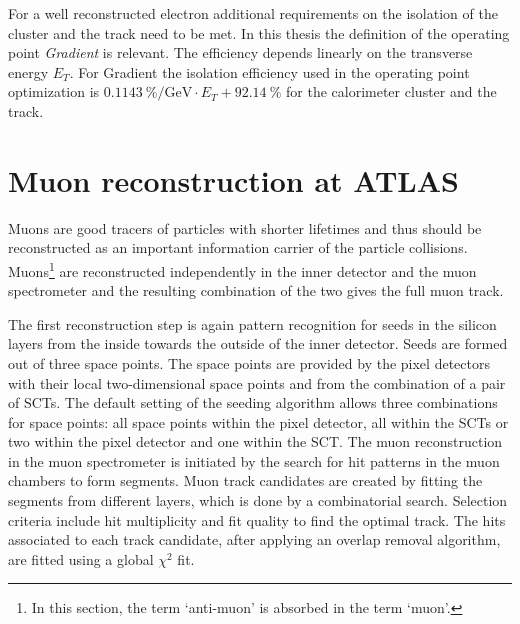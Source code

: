 For a well reconstructed electron additional requirements on the isolation of the cluster and the track need to be met. In this thesis the definition of the operating point \textit{Gradient} is relevant. The efficiency depends linearly on the transverse energy $E_T$. For Gradient the isolation efficiency used in the operating point optimization is $\SI{0.1143}{\percent\per\giga\electronvolt}\cdot E_T+\SI{92.14}{\percent}$ for the calorimeter cluster and the track. \cite{ePerformance}
%
%
\section{Muon reconstruction at ATLAS}\label{muReconstruction}
Muons are good tracers of particles with shorter lifetimes and thus should be reconstructed as an important information carrier of the particle collisions. Muons\footnote{In this section, the term `anti-muon' is absorbed in the term `muon'.} are reconstructed independently in the inner detector and the muon spectrometer and the resulting combination of the two gives the full muon track. \cite{muPerformance}\par
The first reconstruction step is again pattern recognition for seeds in the silicon layers from the inside towards the outside of the inner detector. Seeds are formed out of three space points. The space points are provided by the pixel detectors with their local two-dimensional space points and from the combination of a pair of SCTs. The default setting of the seeding algorithm allows three combinations for space points: all space points within the pixel detector, all within the SCTs or two within the pixel detector and one within the SCT. \cite{muInner}\newline
The muon reconstruction in the muon spectrometer is initiated by the search for hit patterns in the muon chambers to form segments. Muon track candidates are created by fitting the segments from different layers, which is done by a combinatorial search. Selection criteria include hit multiplicity and fit quality to find the optimal track. The hits associated to each track candidate, after applying an overlap removal algorithm, are fitted using a global $\chi^2$ fit. \cite{muPerformance}\newline
